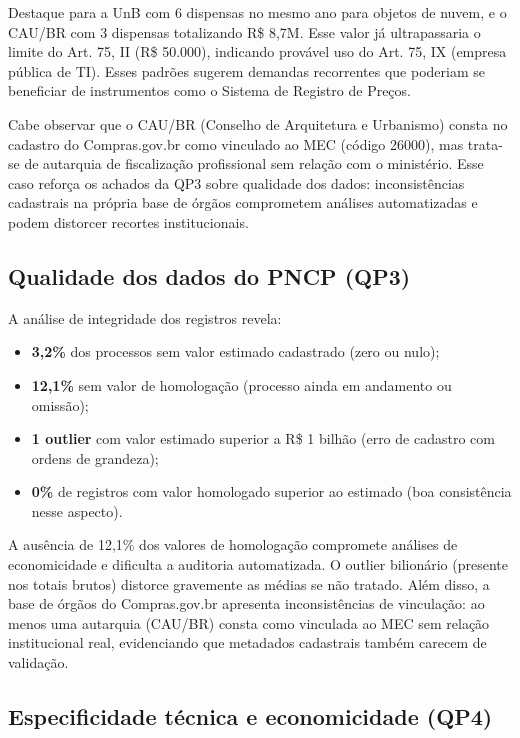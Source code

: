 \documentclass[12pt]{article}
\begin{document}
Destaque para a UnB com 6 dispensas no mesmo ano para objetos de nuvem, e o CAU/BR com 3 dispensas totalizando R\$ 8,7M. Esse valor já ultrapassaria o limite do Art. 75, II (R\$ 50.000), indicando provável uso do Art. 75, IX (empresa pública de TI). Esses padrões sugerem demandas recorrentes que poderiam se beneficiar de instrumentos como o Sistema de Registro de Preços.

Cabe observar que o CAU/BR (Conselho de Arquitetura e Urbanismo) consta no cadastro do Compras.gov.br como vinculado ao MEC (código 26000), mas trata-se de autarquia de fiscalização profissional sem relação com o ministério. Esse caso reforça os achados da QP3 sobre qualidade dos dados: inconsistências cadastrais na própria base de órgãos comprometem análises automatizadas e podem distorcer recortes institucionais.

\subsection{Qualidade dos dados do PNCP (QP3)}

A análise de integridade dos registros revela:

\begin{itemize}
\item \textbf{3,2\%} dos processos sem valor estimado cadastrado (zero ou nulo);
\item \textbf{12,1\%} sem valor de homologação (processo ainda em andamento ou omissão);
\item \textbf{1 outlier} com valor estimado superior a R\$ 1 bilhão (erro de cadastro com ordens de grandeza);
\item \textbf{0\%} de registros com valor homologado superior ao estimado (boa consistência nesse aspecto).
\end{itemize}

A ausência de 12,1\% dos valores de homologação compromete análises de economicidade e dificulta a auditoria automatizada. O outlier bilionário (presente nos totais brutos) distorce gravemente as médias se não tratado. Além disso, a base de órgãos do Compras.gov.br apresenta inconsistências de vinculação: ao menos uma autarquia (CAU/BR) consta como vinculada ao MEC sem relação institucional real, evidenciando que metadados cadastrais também carecem de validação.

\subsection{Especificidade técnica e economicidade (QP4)}
\end{document}
